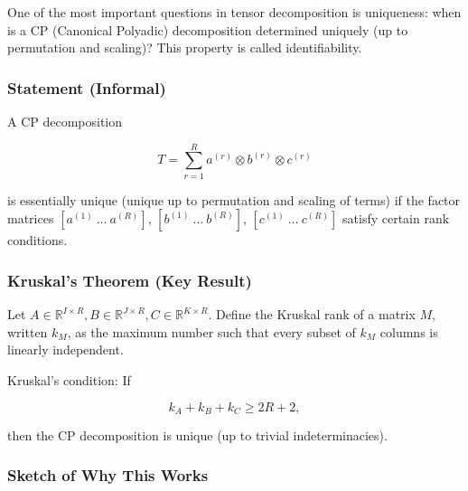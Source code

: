 \documentclass[
  letterpaper,
  DIV=11,
  numbers=noendperiod]{scrreprt}
\begin{document}
One of the most important questions in tensor decomposition is
uniqueness: when is a CP (Canonical Polyadic) decomposition determined
uniquely (up to permutation and scaling)? This property is called
identifiability.

\subsubsection{Statement (Informal)}\label{statement-informal}

A CP decomposition

\[
T = \sum_{r=1}^R a^{(r)} \otimes b^{(r)} \otimes c^{(r)}
\]

is essentially unique (unique up to permutation and scaling of terms) if
the factor matrices \([a^{(1)} \ \dots \ a^{(R)}]\),
\([b^{(1)} \ \dots \ b^{(R)}]\), \([c^{(1)} \ \dots \ c^{(R)}]\) satisfy
certain rank conditions.

\subsubsection{Kruskal's Theorem (Key
Result)}\label{kruskals-theorem-key-result}

Let
\(A \in \mathbb{R}^{I \times R}, B \in \mathbb{R}^{J \times R}, C \in \mathbb{R}^{K \times R}\).
Define the Kruskal rank of a matrix \(M\), written \(k_M\), as the
maximum number such that every subset of \(k_M\) columns is linearly
independent.

Kruskal's condition: If

\[
k_A + k_B + k_C \geq 2R + 2,
\]

then the CP decomposition is unique (up to trivial indeterminacies).

\subsubsection{Sketch of Why This Works}\label{sketch-of-why-this-works}
\end{document}
